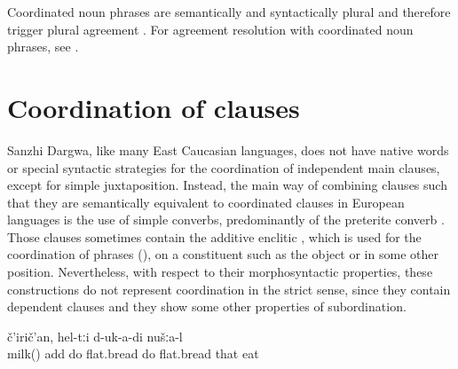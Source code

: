 Coordinated noun phrases are semantically and syntactically plural and therefore trigger plural agreement . For agreement resolution with coordinated noun phrases, see .



\section{Coordination of clauses}
\label{sec:Coordination of clauses other phrases}

Sanzhi Dargwa, like many East Caucasian languages, does not have native words or special syntactic strategies for the coordination of independent main clauses, except for simple juxtaposition. Instead, the main way of combining clauses such that they are semantically equivalent to coordinated clauses in European languages is the use of simple converbs, predominantly of the preterite converb . Those clauses sometimes contain the additive enclitic , which is used for the coordination of phrases (), on a constituent such as the object or in some other position. Nevertheless, with respect to their morphosyntactic properties, these constructions do not represent coordination in the strict sense, since they contain dependent clauses and they show some other properties of subordination.
%
\begin{exe}
	\ex	\label{ex:‎We added milk, prepared flat breads and ate them}
		č'irič'an,	hel-tːi	d-uk-a-di	nušːa-l\\
		milk() add	do	flat.bread	do	flat.bread	that	eat	\\
	\glt	{}
\end{exe}

